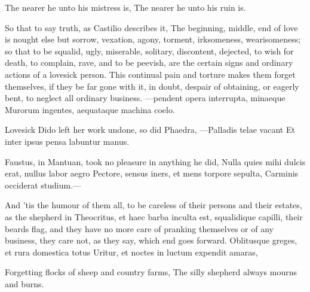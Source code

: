 {The nearer he unto his mistress is,
The nearer he unto his ruin is.

So that to say truth, as Castilio describes it, The beginning,
middle, end of love is nought else but sorrow, vexation, agony,
torment, irksomeness, wearisomeness; so that to be squalid, ugly,
miserable, solitary, discontent, dejected, to wish for death, to
complain, rave, and to be peevish, are the certain signs and ordinary
actions of a lovesick person. This continual pain and torture makes
them forget themselves, if they be far gone with it, in doubt, despair
of obtaining, or eagerly bent, to neglect all ordinary business.
---pendent opera interrupta, minaeque
Murorum ingentes, aequataque machina coelo.

Lovesick Dido left her work undone, so did Phaedra,
---Palladis telae vacant
Et inter ipsus pensa labuntur manus.

Faustus, in Mantuan, took no pleasure in anything he did,
Nulla quies mihi dulcis erat, nullus labor aegro
Pectore, sensus iners, et mens torpore sepulta,
Carminis occiderat studium.---

And 'tis the humour of them all, to be careless of their persons and
their estates, as the shepherd in Theocritus, et haec barba
inculta est, squalidique capilli, their beards flag, and they have no
more care of pranking themselves or of any business, they care not, as
they say, which end goes forward.
Oblitusque greges, et rura domestica totus
Uritur, et noctes in luctum expendit amaras,

Forgetting flocks of sheep and country farms,
The silly shepherd always mourns and burns.

}
